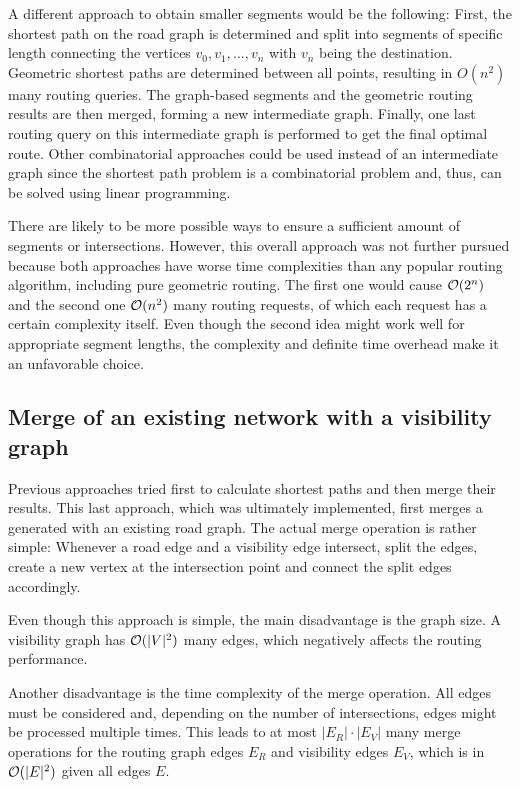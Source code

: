 		A different approach to obtain smaller segments would be the following:
		First, the shortest path on the road graph is determined and split into segments of specific length connecting the vertices $v_0, v_1, ..., v_n$ with $v_n$ being the destination.
		Geometric shortest paths are determined between all points, resulting in $O(n^2)$ many routing queries.
		The graph-based segments and the geometric routing results are then merged, forming a new intermediate graph.
		Finally, one last routing query on this intermediate graph is performed to get the final optimal route.
		Other combinatorial approaches could be used instead of an intermediate graph since the shortest path problem is a combinatorial problem and, thus, can be solved using linear programming\cite{handler-zang-lp-duality}. %
		
		There are likely to be more possible ways to ensure a sufficient amount of segments or intersections.
		However, this overall approach was not further pursued because both approaches have worse time complexities than any popular routing algorithm, including pure geometric routing.
		The first one would cause $\mathcal{O}(2^n)$ and the second one $\mathcal{O}(n^2)$ many routing requests, of which each request has a certain complexity itself.
		Even though the second idea might work well for appropriate segment lengths, the complexity and definite time overhead make it an unfavorable choice.
	
	\subsection{Merge of an existing network with a visibility graph}
	\label{subsec:design-merge-road-network}
	
		Previous approaches tried first to calculate shortest paths and then merge their results.
		This last approach, which was ultimately implemented, first merges a generated  with an existing road graph.
		The actual merge operation is rather simple:
		Whenever a road edge and a visibility edge intersect, split the edges, create a new vertex at the intersection point and connect the split edges accordingly.
		
		Even though this approach is simple, the main disadvantage is the graph size.
		A visibility graph has $\mathcal{O}(|V|^2)$ many edges, which negatively affects the routing performance.
		
		Another disadvantage is the time complexity of the merge operation.
		All edges must be considered and, depending on the number of intersections, edges might be processed multiple times.
		This leads to at most $|E_R| \cdot |E_V|$ many merge operations for the routing graph edges $E_R$ and visibility edges $E_V$, which is in $\mathcal{O}(|E|^2)$ given all edges $E$.
		
